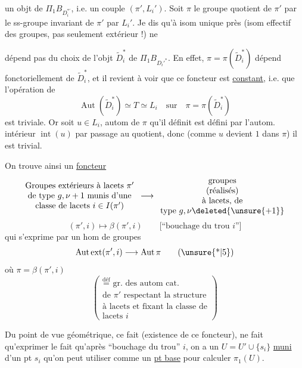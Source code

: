  un objt de \(\Pi_1B_{D_i^{*'}}\), i.e. un couple \((\pi',L_i')\). Soit \(\pi\) le groupe quotient de \(\pi'\) par le ss-groupe invariant de \(\pi'\)   par \(L_i'\). Je dis \margin{\(\Vert\)} qu'à isom unique près (isom effectif des groupes, pas seulement extérieur !)  ne


dépend pas du choix de l'objt \(\widetilde D_i^*\) de \(\Pi_1B_{D_i'^*}\). En effet, \(\pi=\pi(\widetilde D_i^*)\) dépend fonctoriellement de \(\widetilde D_i^*\), et il revient à voir que ce foncteur est \uline{constant}, i.e. que l'opération de
\[
\operatorname{Aut}(\widetilde D_i^*)\simeq T\simeq L_i
\quad\text{sur}\quad
\pi=\pi(\widetilde D_i^*)
\]
est triviale. Or soit \(u\in L_i\),  autom de \(\pi\) qu'il définit est défini par l'autom. intérieur \(\operatorname{int}(u)\) par passage au quotient, donc (comme \(u\) devient \(1\) dans \(\pi\)) il est trivial. 

On trouve ainsi un \uline{foncteur}
\[
\begin{array}{c}
\text{Groupes extérieurs à lacets }\pi'\\
\text{de type }g,\nu+1\text{ munis d'une}\\
\text{classe de lacets }i\in I(\pi')
\end{array}
\longrightarrow
\begin{array}{c}
\text{groupes}\\
\text{(réalisés)}\\
\text{à lacets, de}\\
\text{type }g,\nu\deleted{\unsure{+1}}
\end{array}
\]
\[
(\pi',i)\longmapsto\beta(\pi',i)
\qquad
\text{[``bouchage du trou \(i\)'']}
\]
qui s'exprime par un hom de groupes
\[
\operatorname{Aut\,ext}(\pi',i)\longrightarrow\operatorname{Aut}\pi
\tag{\unsure{*|5}}
\]
où \(\pi=\beta(\pi',i)\)
\[
\left(
\begin{array}{l}
\overset{\text{déf}}{=}\text{ gr. des autom cat.}\\
\text{de }\pi'\text{ respectant la structure}\\
\text{à lacets et fixant la classe de}\\
\text{lacets }i
\end{array}
\right)
\]


Du point de vue géométrique, ce fait (existence de ce foncteur), ne fait qu'exprimer le fait qu'après ``bouchage du trou'' \(i\), on a un  \(U=U'\cup\{s_i\}\) \uline{muni} d'un pt \(s_i\) qu'on peut utiliser comme un \uline{pt base}  pour calculer \(\pi_1(U)\).

